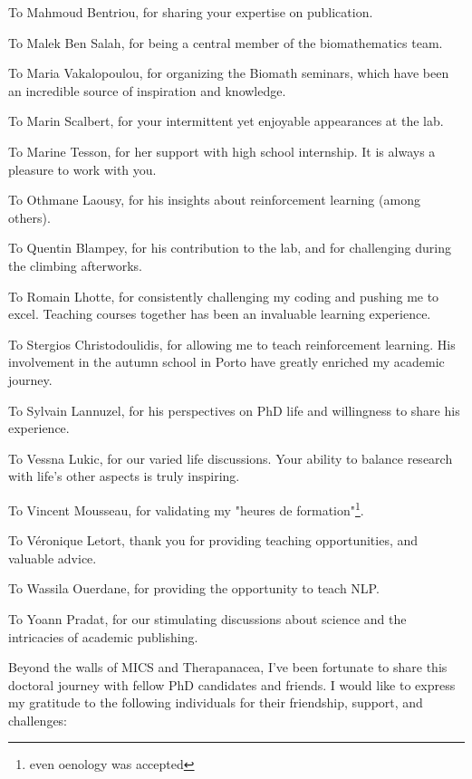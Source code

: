 To Mahmoud Bentriou, for sharing your expertise on publication.

To Malek Ben Salah, for being a central member of the biomathematics team.

To Maria Vakalopoulou, for organizing the Biomath seminars, which have been an incredible source of inspiration and knowledge.

To Marin Scalbert, for your intermittent yet enjoyable appearances at the lab.

To Marine Tesson, for her support with high school internship.
It is always a pleasure to work with you.


To Othmane Laousy, for his insights about reinforcement learning (among others).

To Quentin Blampey, for his contribution to the lab, and for challenging during the climbing afterworks.

To Romain Lhotte, for consistently challenging my coding and pushing me to excel.
Teaching courses together has been an invaluable learning experience.

To Stergios Christodoulidis, for allowing me to teach reinforcement learning.
His involvement in the autumn school in Porto have greatly enriched my academic journey.

To Sylvain Lannuzel, for his perspectives on PhD life and willingness to share his experience.

To Vessna Lukic, for our varied life discussions.
Your ability to balance research with life's other aspects is truly inspiring.

To Vincent Mousseau, for validating my "heures de formation"\footnote{even oenology was accepted}.

To Véronique Letort, thank you for providing teaching opportunities, and valuable advice.

To Wassila Ouerdane, for providing the opportunity to teach NLP.

To Yoann Pradat, for our stimulating discussions about science and the intricacies of academic publishing.



Beyond the walls of MICS and Therapanacea, I've been fortunate to share this doctoral journey with fellow PhD candidates and friends.
I would like to express my gratitude to the following individuals for their friendship, support, and challenges:

